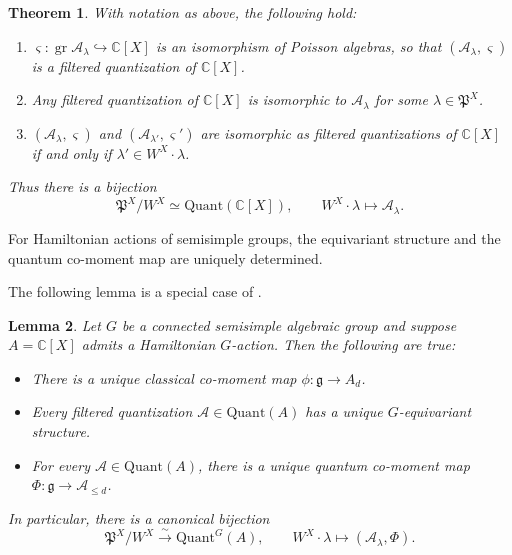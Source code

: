 \documentclass[11pt, a4paper]{amsart}
\newcommand{\C}{\mathbb{C}}
\newcommand{\gr}{\operatorname{gr}}
\newcommand{\fg}{\mathfrak{g}}
\newcommand{\fP}{\mathfrak{P}}
\newcommand{\cA}{\mathcal{A}}
\newtheorem{Thm}{Theorem}[subsection]
\newtheorem{Lem}[Thm]{Lemma}
\theoremstyle{definition}
\numberwithin{equation}{section}
\begin{document}




\begin{Thm} \label{thm:quant_conical_symp_sing}
	With notation as above, the following hold:
	\begin{enumerate}[label=(\roman*)]
		\item $\varsigma: \gr \cA_{\lambda} \hookrightarrow \C[X]$ is an isomorphism of Poisson algebras, so that $(\cA_{\lambda}, \varsigma)$ is a filtered quantization of $\C[X]$.
		\item Any filtered quantization of $\C[X]$ is isomorphic to $\cA_{\lambda}$ for some $\lambda \in \fP^X$.
		\item $(\cA_{\lambda}, \varsigma)$ and $(\cA_{\lambda'}, \varsigma')$ are isomorphic as filtered quantizations of $\C[X]$ if and only if $\lambda' \in W^X \cdot \lambda$.
	\end{enumerate}
Thus there is a bijection
%
\[ \fP^X/W^X \simeq \mathrm{Quant}(\C[X]), \qquad W^X \cdot \lambda \mapsto \cA_{\lambda}. \]
%
\end{Thm}

For Hamiltonian actions of semisimple groups, the equivariant structure and the quantum co-moment map are uniquely determined.

The following lemma is a special case of \cite[Lemma 4.11.2]{LMBM}.

\begin{Lem} \label{lem:Hamiltonian_quant}
	Let $G$ be a connected semisimple algebraic group and suppose $A=\C[X]$ admits a Hamiltonian $G$-action. Then the following are true:
	\begin{itemize}
		\item[(i)] There is a unique classical co-moment map $\phi: \fg \to A_d$.
		\item[(ii)] Every filtered quantization $\cA \in \mathrm{Quant}(A)$ has a unique $G$-equivariant structure.
		\item[(iii)] For every $\cA \in \mathrm{Quant}(A)$, there is a unique quantum co-moment map $\Phi: \fg \to \cA_{\leq d}$.
	\end{itemize}
	In particular, there is a canonical bijection
	\[ \fP^X/W^X \xrightarrow{\sim} \mathrm{Quant}^G(A), \qquad W^X \cdot \lambda \mapsto (\cA_{\lambda}, \Phi).\]
\end{Lem}
\end{document}
